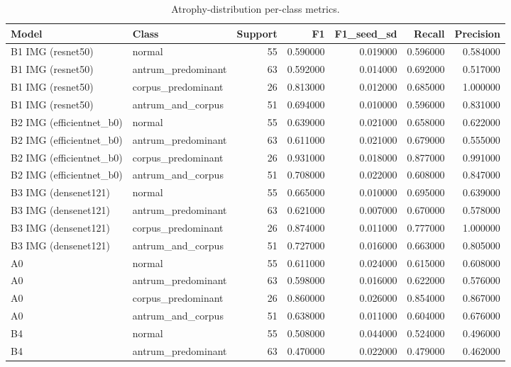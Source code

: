 \begin{table}
\caption{Atrophy-distribution per-class metrics.}
\label{tab:table4_distribution_per_class}
\begin{tabular}{llrrrrr}
\toprule
Model & Class & Support & F1 & F1\_seed\_sd & Recall & Precision \\
\midrule
B1 IMG (resnet50) & normal & 55 & 0.590000 & 0.019000 & 0.596000 & 0.584000 \\
B1 IMG (resnet50) & antrum\_predominant & 63 & 0.592000 & 0.014000 & 0.692000 & 0.517000 \\
B1 IMG (resnet50) & corpus\_predominant & 26 & 0.813000 & 0.012000 & 0.685000 & 1.000000 \\
B1 IMG (resnet50) & antrum\_and\_corpus & 51 & 0.694000 & 0.010000 & 0.596000 & 0.831000 \\
B2 IMG (efficientnet\_b0) & normal & 55 & 0.639000 & 0.021000 & 0.658000 & 0.622000 \\
B2 IMG (efficientnet\_b0) & antrum\_predominant & 63 & 0.611000 & 0.021000 & 0.679000 & 0.555000 \\
B2 IMG (efficientnet\_b0) & corpus\_predominant & 26 & 0.931000 & 0.018000 & 0.877000 & 0.991000 \\
B2 IMG (efficientnet\_b0) & antrum\_and\_corpus & 51 & 0.708000 & 0.022000 & 0.608000 & 0.847000 \\
B3 IMG (densenet121) & normal & 55 & 0.665000 & 0.010000 & 0.695000 & 0.639000 \\
B3 IMG (densenet121) & antrum\_predominant & 63 & 0.621000 & 0.007000 & 0.670000 & 0.578000 \\
B3 IMG (densenet121) & corpus\_predominant & 26 & 0.874000 & 0.011000 & 0.777000 & 1.000000 \\
B3 IMG (densenet121) & antrum\_and\_corpus & 51 & 0.727000 & 0.016000 & 0.663000 & 0.805000 \\
A0 & normal & 55 & 0.611000 & 0.024000 & 0.615000 & 0.608000 \\
A0 & antrum\_predominant & 63 & 0.598000 & 0.016000 & 0.622000 & 0.576000 \\
A0 & corpus\_predominant & 26 & 0.860000 & 0.026000 & 0.854000 & 0.867000 \\
A0 & antrum\_and\_corpus & 51 & 0.638000 & 0.011000 & 0.604000 & 0.676000 \\
B4 & normal & 55 & 0.508000 & 0.044000 & 0.524000 & 0.496000 \\
B4 & antrum\_predominant & 63 & 0.470000 & 0.022000 & 0.479000 & 0.462000 \\

\end{tabular}
\end{table}
